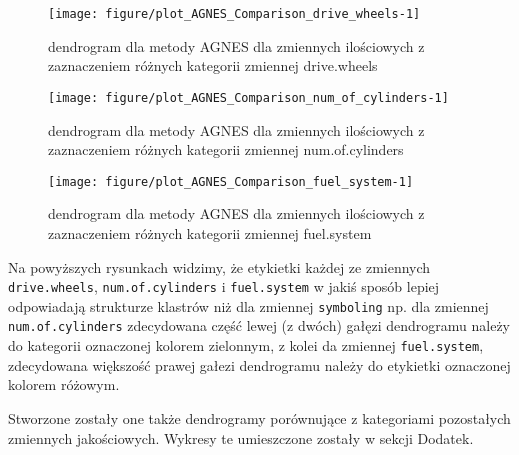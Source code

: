 \documentclass[12pt, a4paper]{article}\usepackage[]{graphicx}\usepackage[]{xcolor}
\makeatletter
\def\maxwidth{ %
  \ifdim\Gin@nat@width>\linewidth
    \linewidth
  \else
    \Gin@nat@width
  \fi
}
\newenvironment{knitrout}{}{} %
\makeatother
\begin{document}
\begin{knitrout}
\color{fgcolor}\begin{figure}[H]

{\centering \texttt{[image: figure/plot\_AGNES\_Comparison\_drive\_wheels-1]} 

}

\caption[dendrogram dla metody AGNES dla zmiennych ilościowych z zaznaczeniem różnych kategorii zmiennej drive.wheels]{dendrogram dla metody AGNES dla zmiennych ilościowych z zaznaczeniem różnych kategorii zmiennej drive.wheels}\label{fig:plot_AGNES_Comparison_drive.wheels}
\end{figure}

\end{knitrout}
\begin{knitrout}
\color{fgcolor}\begin{figure}[H]

{\centering \texttt{[image: figure/plot\_AGNES\_Comparison\_num\_of\_cylinders-1]} 

}

\caption[dendrogram dla metody AGNES dla zmiennych ilościowych z zaznaczeniem różnych kategorii zmiennej num.of.cylinders]{dendrogram dla metody AGNES dla zmiennych ilościowych z zaznaczeniem różnych kategorii zmiennej num.of.cylinders}\label{fig:plot_AGNES_Comparison_num.of.cylinders}
\end{figure}

\end{knitrout}
\begin{knitrout}
\color{fgcolor}\begin{figure}[H]

{\centering \texttt{[image: figure/plot\_AGNES\_Comparison\_fuel\_system-1]} 

}

\caption[dendrogram dla metody AGNES dla zmiennych ilościowych z zaznaczeniem różnych kategorii zmiennej fuel.system]{dendrogram dla metody AGNES dla zmiennych ilościowych z zaznaczeniem różnych kategorii zmiennej fuel.system}\label{fig:plot_AGNES_Comparison_fuel.system}
\end{figure}

\end{knitrout}

Na powyższych rysunkach widzimy, że etykietki każdej ze zmiennych \texttt{drive.wheels}, \texttt{num.of.cylinders} i \texttt{fuel.system} w jakiś sposób 
lepiej odpowiadają strukturze klastrów niż dla zmiennej \texttt{symboling} np. dla zmiennej \texttt{num.of.cylinders} zdecydowana część lewej (z dwóch) gałęzi dendrogramu należy do kategorii oznaczonej kolorem zielonnym, z kolei da zmiennej \texttt{fuel.system}, zdecydowana większość prawej gałezi dendrogramu należy do etykietki oznaczonej kolorem różowym.
\par
Stworzone zostały one także dendrogramy porównujące z kategoriami pozostałych zmiennych jakościowych. Wykresy te umieszczone zostały w sekcji Dodatek. 
\end{document}
